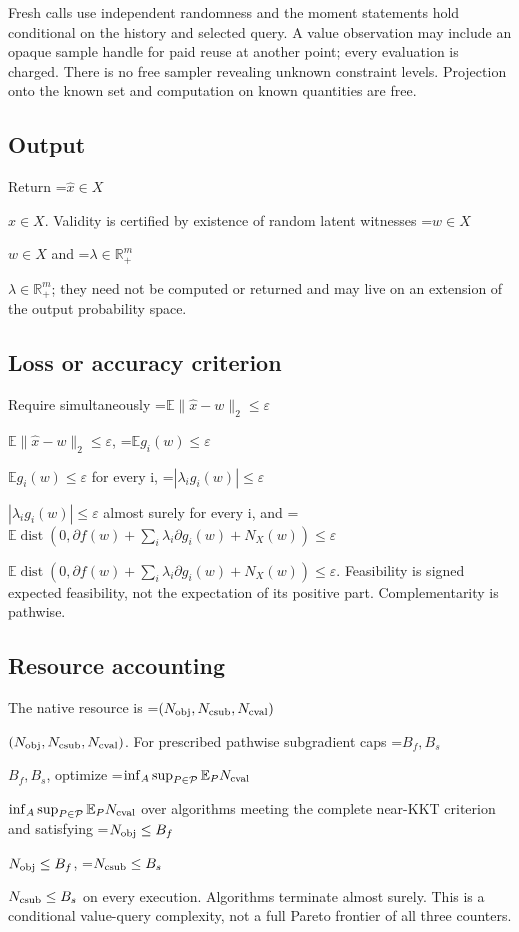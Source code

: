 \documentclass[10pt,a4paper]{article}
\newcommand{\AtlasMath}[1]{\par\begingroup\centering\setbox0=\hbox{$\displaystyle #1$}\ifdim\wd0>1.4\linewidth\typeout{ATLAS WIDE FORMULA: \the\wd0}\fi\ifdim\wd0>\linewidth\resizebox{\linewidth}{!}{\box0}\else\box0\fi\par\endgroup}
\newcommand{\AtlasInlineMath}[1]{\begingroup\setbox0=\hbox{$#1$}\ifdim\wd0>.4\linewidth\endgroup\AtlasMath{#1}\else\endgroup$#1$\fi}
\begin{document}
Fresh calls use independent randomness and the moment statements hold conditional on the history and selected query. A value observation may include an opaque sample handle for paid reuse at another point; every evaluation is charged. There is no free sampler revealing unknown constraint levels. Projection onto the known set and computation on known quantities are free.



\subsection{Output}


Return \AtlasInlineMath{\widehat x\in X}. Validity is certified by existence of random latent witnesses \AtlasInlineMath{w\in X} and \AtlasInlineMath{\lambda\in\mathbb R_+^m}; they need not be computed or returned and may live on an extension of the output probability space.



\subsection{Loss or accuracy criterion}


Require simultaneously \AtlasInlineMath{\mathbb E\|\widehat x-w\|_2\le\varepsilon}, \AtlasInlineMath{\mathbb E g_i(w)\le\varepsilon} for every i, \AtlasInlineMath{|\lambda_i g_i(w)|\le\varepsilon} almost surely for every i, and \AtlasInlineMath{\mathbb E\operatorname{dist}(0,\partial f(w)+\sum_i\lambda_i\partial g_i(w)+N_X(w))\le\varepsilon}. Feasibility is signed expected feasibility, not the expectation of its positive part. Complementarity is pathwise.



\subsection{Resource accounting}


The native resource is \AtlasInlineMath{(N_{\rm obj},N_{\rm csub},N_{\rm cval})}. For prescribed pathwise subgradient caps \AtlasInlineMath{B_f,B_s}, optimize \AtlasInlineMath{\inf_A\sup_{P\in\mathcal P}\mathbb E_PN_{\rm cval}} over algorithms meeting the complete near-KKT criterion and satisfying \AtlasInlineMath{N_{\rm obj}\le B_f}, \AtlasInlineMath{N_{\rm csub}\le B_s} on every execution. Algorithms terminate almost surely. This is a conditional value-query complexity, not a full Pareto frontier of all three counters.
\end{document}
